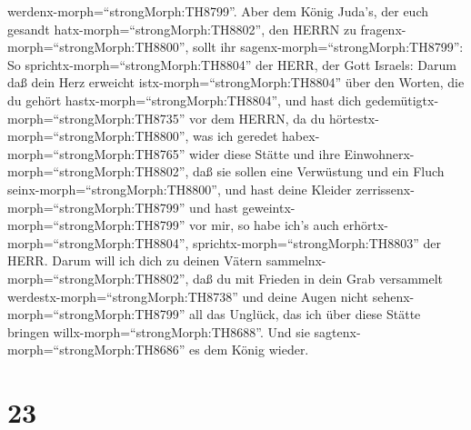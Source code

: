 werdenx-morph=``strongMorph:TH8799''.  Aber dem König
Juda's, der euch gesandt hatx-morph=``strongMorph:TH8802'', den HERRN zu
fragenx-morph=``strongMorph:TH8800'', sollt ihr
sagenx-morph=``strongMorph:TH8799'': So
sprichtx-morph=``strongMorph:TH8804'' der HERR, der Gott Israels:
 Darum daß dein Herz erweicht
istx-morph=``strongMorph:TH8804'' über den Worten, die du gehört
hastx-morph=``strongMorph:TH8804'', und hast dich
gedemütigtx-morph=``strongMorph:TH8735'' vor dem HERRN, da du
hörtestx-morph=``strongMorph:TH8800'', was ich geredet
habex-morph=``strongMorph:TH8765'' wider diese Stätte und ihre
Einwohnerx-morph=``strongMorph:TH8802'', daß sie sollen eine Verwüstung
und ein Fluch seinx-morph=``strongMorph:TH8800'', und hast deine Kleider
zerrissenx-morph=``strongMorph:TH8799'' und hast
geweintx-morph=``strongMorph:TH8799'' vor mir, so habe ich's auch
erhörtx-morph=``strongMorph:TH8804'',
sprichtx-morph=``strongMorph:TH8803'' der HERR.  Darum will
ich dich zu deinen Vätern sammelnx-morph=``strongMorph:TH8802'', daß du
mit Frieden in dein Grab versammelt
werdestx-morph=``strongMorph:TH8738'' und deine Augen nicht
sehenx-morph=``strongMorph:TH8799'' all das Unglück, das ich über diese
Stätte bringen willx-morph=``strongMorph:TH8688''. Und sie
sagtenx-morph=``strongMorph:TH8686'' es dem König wieder.

\hypertarget{section-22}{%
\section{23}\label{section-22}}

